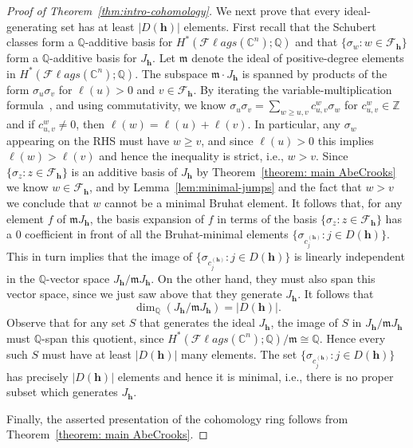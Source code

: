 \documentclass[11pt]{amsart}
\theoremstyle{plain}
\newenvironment{theoremproof}[1]
  {\begin{proof}[Proof of Theorem~\ref{#1}]}
  {\end{proof}}
\theoremstyle{definition}
\newcommand{\hess}{{\mathbf h}}
\newcommand{\Fl}{\mathcal{F}\ell ags}
\newcommand{\C}{\mathbb{C}}           %
\newcommand{\Z}{\mathbb{ Z}}           %
\newcommand{\Q}{\mathbb{ Q}}           %
\numberwithin{equation}{section}
\begin{document}
\begin{theoremproof}{thm:intro-cohomology}
We next prove that every ideal-generating set has at
least $|D(\hess)|$ elements. First recall that the Schubert classes form a $\Q$-additive basis for $H^*(\Fl(\C^n);\Q)$ and that $\{\sigma_w: w \in \mathcal{F}_\hess\}$ form a $\Q$-additive basis for $J_\hess$. Let $\mathfrak{m}$ denote the ideal of positive-degree elements in $H^*(\Fl(\C^n);\Q)$. The subspace $\mathfrak{m} \cdot J_\hess$ is spanned by products of the form $\sigma_u \sigma_v$ for $\ell(u)>0$ and $v \in \mathcal{F}_\hess$. By iterating the variable-multiplication formula~\cite[(4.15$'$)]{Macdonald1991}, and using commutativity, we know $\sigma_u \sigma_v = \sum_{w \geq u,v} c^w_{u,v} \sigma_w$ for $c^w_{u,v} \in \Z$ and if $c^w_{u,v} \neq 0$, then $\ell(w)=\ell(u)+\ell(v)$. In particular, any $\sigma_w$ appearing on the RHS must have $w \geq v$, and since $\ell(u)>0$ this implies $\ell(w)>\ell(v)$ and hence the inequality is strict, i.e., $w>v$. Since $\{\sigma_z: z \in \mathcal{F}_\hess\}$ is an additive basis of $J_\hess$ by Theorem~\ref{theorem: main AbeCrooks} we know $w \in \mathcal{F}_\hess$, and by Lemma~\ref{lem:minimal-jumps} and the fact that $w>v$ we conclude that $w$ cannot be a minimal Bruhat element. It follows that, for any element $f$ of $\mathfrak{m}J_\hess$, the basis expansion 
of $f$ in terms of the basis $\{\sigma_z: z \in \mathcal{F}_\hess\}$ has a $0$ coefficient in front of all the Bruhat-minimal elements $\{\sigma_{c_j^{(\hess)}}: j \in D(\hess)\}$. This in turn implies that the image of $\{\sigma_{c_j^{(\hess)}}: j \in D(\hess)\}$ is linearly independent in the $\Q$-vector space $J_\hess/\mathfrak{m}J_\hess$. On the other hand, they must also span this vector space, since we just saw above that they generate $J_\hess$. It follows that 
\[
\dim_\Q(J_\hess/\mathfrak mJ_\hess)=|D(\hess)|.
\]
Observe that for any set $S$ that generates the ideal $J_\hess$, the image of $S$ in $J_\hess/\mathfrak{m}J_\hess$ must $\Q$-span this quotient, since $H^*(\Fl(\C^n);\Q)/\mathfrak{m} \cong \Q$. Hence every such $S$ must have at least $\lvert D(\hess)\rvert$ many elements. The set $\{\sigma_{c_j^{(\hess)}}: j \in D(\hess)\}$ has precisely $\lvert D(\hess)\rvert$ elements and hence it is minimal, i.e., there is no proper subset which generates $J_\hess$. 


Finally, the asserted presentation of the cohomology
ring follows from Theorem~\ref{theorem: main AbeCrooks}.
\end{theoremproof}
\end{document}
